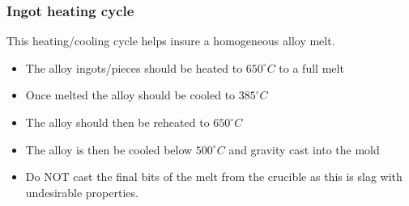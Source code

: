\subsubsection{Ingot heating cycle}

This heating/cooling cycle helps insure a homogeneous alloy melt.
\begin{itemize}
\item The \MgZnCa alloy ingots/pieces should be heated to $650^{\circ}C$ to a full melt
\item Once melted the alloy should be cooled to $385^{\circ}C$
\item The alloy should then be reheated to $650^{\circ}C$
\item The alloy is then be cooled below $500^{\circ}C$ and gravity cast into the mold
\item Do NOT cast the final bits of the melt from the crucible as this is slag with undesirable properties. 
\end{itemize}